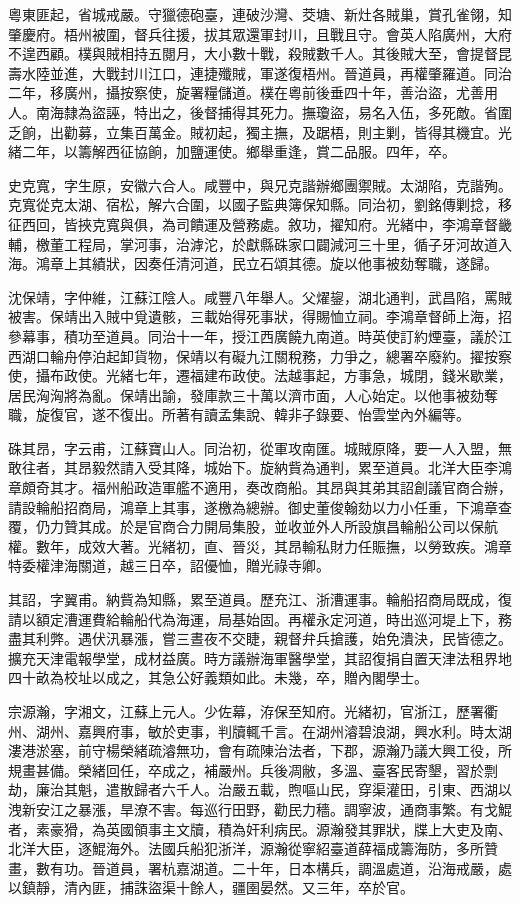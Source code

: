 \begin{pinyinscope}
粵東匪起，省城戒嚴。守獵德砲臺，連破沙灣、茭塘、新灶各賊巢，賞孔雀翎，知肇慶府。梧州被圍，督兵往援，拔其眾還軍封川，且戰且守。會英人陷廣州，大府不遑西顧。樸與賊相持五閱月，大小數十戰，殺賊數千人。其後賊大至，會提督昆壽水陸並進，大戰封川江口，連捷殲賊，軍遂復梧州。晉道員，再權肇羅道。同治二年，移廣州，攝按察使，旋署糧儲道。樸在粵前後垂四十年，善治盜，尤善用人。南海隸為盜誣，特出之，後督捕得其死力。撫瓊盜，易名入伍，多死敵。省圍乏餉，出勸募，立集百萬金。賊初起，獨主撫，及踞梧，則主剿，皆得其機宜。光緒二年，以籌解西征協餉，加鹽運使。鄉舉重逢，賞二品服。四年，卒。

史克寬，字生原，安徽六合人。咸豐中，與兄克諧辦鄉團禦賊。太湖陷，克諧殉。克寬從克太湖、宿松，解六合圍，以國子監典簿保知縣。同治初，劉銘傳剿捻，移征西回，皆挾克寬與俱，為司饋運及營務處。敘功，擢知府。光緒中，李鴻章督畿輔，檄董工程局，掌河事，治滹沱，於獻縣硃家口闢減河三十里，循子牙河故道入海。鴻章上其績狀，因奏任清河道，民立石頌其德。旋以他事被劾奪職，遂歸。

沈保靖，字仲維，江蘇江陰人。咸豐八年舉人。父燿鋆，湖北通判，武昌陷，罵賊被害。保靖出入賊中覓遺骸，三載始得死事狀，得賜恤立祠。李鴻章督師上海，招參幕事，積功至道員。同治十一年，授江西廣饒九南道。時英使訂約煙臺，議於江西湖口輪舟停泊起卸貨物，保靖以有礙九江關稅務，力爭之，總署卒廢約。擢按察使，攝布政使。光緒七年，遷福建布政使。法越事起，方事急，城閉，錢米歇業，居民洶洶將為亂。保靖出諭，發庫款三十萬以濟市面，人心始定。以他事被劾奪職，旋復官，遂不復出。所著有讀孟集說、韓非子錄要、怡雲堂內外編等。

硃其昂，字云甫，江蘇寶山人。同治初，從軍攻南匯。城賊原降，要一人入盟，無敢往者，其昂毅然請入受其降，城始下。旋納貲為通判，累至道員。北洋大臣李鴻章頗奇其才。福州船政造軍艦不適用，奏改商船。其昂與其弟其詔創議官商合辦，請設輪船招商局，鴻章上其事，遂檄為總辦。御史董俊翰劾以力小任重，下鴻章查覆，仍力贊其成。於是官商合力開局集股，並收並外人所設旗昌輪船公司以保航權。數年，成效大著。光緒初，直、晉災，其昂輸私財力任賑撫，以勞致疾。鴻章特委權津海關道，越三日卒，詔優恤，贈光祿寺卿。

其詔，字翼甫。納貲為知縣，累至道員。歷充江、浙漕運事。輪船招商局既成，復請以額定漕運費給輪船代為海運，局基始固。再權永定河道，時出巡河堤上下，務盡其利弊。遇伏汛暴漲，嘗三晝夜不交睫，親督弁兵搶護，始免潰決，民皆德之。擴充天津電報學堂，成材益廣。時方議辦海軍醫學堂，其詔復捐自置天津法租界地四十畝為校址以成之，其急公好義類如此。未幾，卒，贈內閣學士。

宗源瀚，字湘文，江蘇上元人。少佐幕，洊保至知府。光緒初，官浙江，歷署衢州、湖州、嘉興府事，敏於吏事，判牘輒千言。在湖州濬碧浪湖，興水利。時太湖漊港淤塞，前守楊榮緒疏濬無功，會有疏陳治法者，下郡，源瀚乃議大興工役，所規畫甚備。榮緒回任，卒成之，補嚴州。兵後凋敝，多溫、臺客民寄墾，習於剽劫，廉治其魁，遣散歸者六千人。治嚴五載，煦嘔山民，穿渠灌田，引東、西湖以洩新安江之暴漲，旱潦不害。每巡行田野，勸民力穡。調寧波，通商事繁。有戈鯤者，素豪猾，為英國領事主文牘，積為奸利病民。源瀚發其罪狀，牒上大吏及南、北洋大臣，逐鯤海外。法國兵船犯浙洋，源瀚從寧紹臺道薛福成籌海防，多所贊畫，數有功。晉道員，署杭嘉湖道。二十年，日本構兵，調溫處道，沿海戒嚴，處以鎮靜，清內匪，捕誅盜渠十餘人，疆圉晏然。又三年，卒於官。


\end{pinyinscope}
